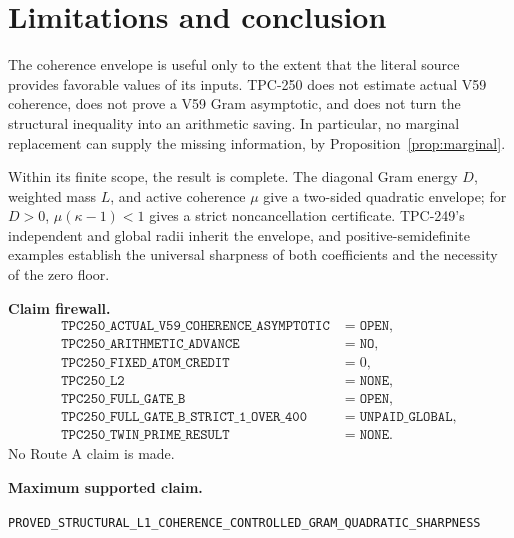 \documentclass[11pt]{article}
\theoremstyle{remark}
\begin{document}
\section{Limitations and conclusion}

The coherence envelope is useful only to the extent that the literal source
provides favorable values of its inputs.  TPC-250 does not estimate actual V59
coherence, does not prove a V59 Gram asymptotic, and does not turn the
structural inequality into an arithmetic saving.  In particular, no marginal
replacement can supply the missing information, by
Proposition~\ref{prop:marginal}.

Within its finite scope, the result is complete.  The diagonal Gram energy
$D$, weighted mass $L$, and active coherence $\mu$ give a two-sided quadratic
envelope; for $D>0$, $\mu(\kappa-1)<1$ gives a strict noncancellation
certificate.  TPC-249's independent and global radii inherit the envelope,
and positive-semidefinite examples establish the universal sharpness of both
coefficients and the necessity of the zero floor.

\medskip
\noindent\textbf{Claim firewall.}
\begin{align*}
 \texttt{TPC250\_ACTUAL\_V59\_COHERENCE\_ASYMPTOTIC}&=\texttt{OPEN},\\
 \texttt{TPC250\_ARITHMETIC\_ADVANCE}&=\texttt{NO},\\
 \texttt{TPC250\_FIXED\_ATOM\_CREDIT}&=0,\\
 \texttt{TPC250\_L2}&=\texttt{NONE},\\
 \texttt{TPC250\_FULL\_GATE\_B}&=\texttt{OPEN},\\
 \texttt{TPC250\_FULL\_GATE\_B\_STRICT\_1\_OVER\_400}
 &=\texttt{UNPAID\_GLOBAL},\\
 \texttt{TPC250\_TWIN\_PRIME\_RESULT}&=\texttt{NONE}.
\end{align*}
No Route A claim is made.

\medskip
\noindent\textbf{Maximum supported claim.}
\begin{center}
\small\nolinkurl{PROVED_STRUCTURAL_L1_COHERENCE_CONTROLLED_GRAM_QUADRATIC_SHARPNESS}
\end{center}



\end{document}
